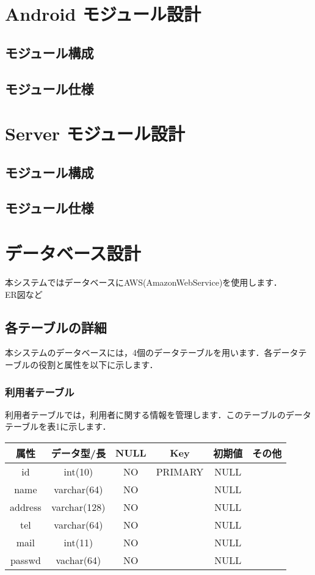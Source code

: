 \documentclass[a4j,titlepage]{jarticle}
\begin{document}
\section{Android モジュール設計}
\subsection{モジュール構成}

\subsection{モジュール仕様}


\section{Server モジュール設計}
\subsection{モジュール構成}
\subsection{モジュール仕様}


\section{データベース設計}
本システムではデータベースにAWS(AmazonWebService)を使用します．\\
ER図など
\subsection{各テーブルの詳細}
本システムのデータベースには，4個のデータテーブルを用います．各データテーブルの役割と属性を以下に示します．
\subsubsection{利用者テーブル}
利用者テーブルでは，利用者に関する情報を管理します．このテーブルのデータテーブルを表1に示します．
\begin{table}[htb]
  \begin{center}
    \begin{tabular}{|c|c|c|c|c|c|} \hline
      属性 & データ型/長 & NULL & Key & 初期値 & その他 \\ \hline \hline
      id & int(10) & NO & PRIMARY & NULL & \\ \hline
      name & varchar(64) & NO &   & NULL & \\ \hline
      address & varchar(128) & NO &   & NULL & \\ \hline
      tel & varchar(64) & NO &   & NULL & \\ \hline
      mail & int(11) & NO &   & NULL & \\ \hline
      passwd & vachar(64) & NO &   & NULL & \\ \hline
    \end{tabular}
  \end{center}
\end{table}
\end{document}
